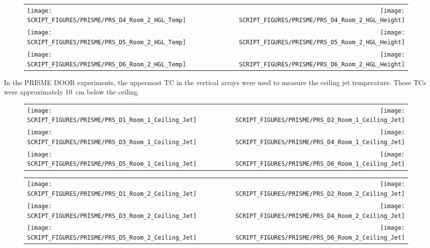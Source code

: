 \begin{figure}[p]
\begin{tabular*}{\textwidth}{l@{\extracolsep{\fill}}r}
\texttt{[image: SCRIPT\_FIGURES/PRISME/PRS\_D4\_Room\_2\_HGL\_Temp]} &
\texttt{[image: SCRIPT\_FIGURES/PRISME/PRS\_D4\_Room\_2\_HGL\_Height]} \\
\texttt{[image: SCRIPT\_FIGURES/PRISME/PRS\_D5\_Room\_2\_HGL\_Temp]} &
\texttt{[image: SCRIPT\_FIGURES/PRISME/PRS\_D5\_Room\_2\_HGL\_Height]} \\
\texttt{[image: SCRIPT\_FIGURES/PRISME/PRS\_D6\_Room\_2\_HGL\_Temp]} &
\texttt{[image: SCRIPT\_FIGURES/PRISME/PRS\_D6\_Room\_2\_HGL\_Height]}
\end{tabular*}
\label{PRISME_HGL_4}
\end{figure}

\clearpage

In the PRISME DOOR experiments, the uppermost TC in the vertical arrays were used to measure the ceiling jet temperature. These TCs were approximately 10~cm below the ceiling.

\begin{figure}[!ht]
\begin{tabular*}{\textwidth}{l@{\extracolsep{\fill}}r}
\texttt{[image: SCRIPT\_FIGURES/PRISME/PRS\_D1\_Room\_1\_Ceiling\_Jet]} &
\texttt{[image: SCRIPT\_FIGURES/PRISME/PRS\_D2\_Room\_1\_Ceiling\_Jet]} \\
\texttt{[image: SCRIPT\_FIGURES/PRISME/PRS\_D3\_Room\_1\_Ceiling\_Jet]} &
\texttt{[image: SCRIPT\_FIGURES/PRISME/PRS\_D4\_Room\_1\_Ceiling\_Jet]} \\
\texttt{[image: SCRIPT\_FIGURES/PRISME/PRS\_D5\_Room\_1\_Ceiling\_Jet]} &
\texttt{[image: SCRIPT\_FIGURES/PRISME/PRS\_D6\_Room\_1\_Ceiling\_Jet]}
\end{tabular*}
\label{PRISME_Ceiling_Jet_Room_1}
\end{figure}

\begin{figure}[p]
\begin{tabular*}{\textwidth}{l@{\extracolsep{\fill}}r}
\texttt{[image: SCRIPT\_FIGURES/PRISME/PRS\_D1\_Room\_2\_Ceiling\_Jet]} &
\texttt{[image: SCRIPT\_FIGURES/PRISME/PRS\_D2\_Room\_2\_Ceiling\_Jet]} \\
\texttt{[image: SCRIPT\_FIGURES/PRISME/PRS\_D3\_Room\_2\_Ceiling\_Jet]} &
\texttt{[image: SCRIPT\_FIGURES/PRISME/PRS\_D4\_Room\_2\_Ceiling\_Jet]} \\
\texttt{[image: SCRIPT\_FIGURES/PRISME/PRS\_D5\_Room\_2\_Ceiling\_Jet]} &
\texttt{[image: SCRIPT\_FIGURES/PRISME/PRS\_D6\_Room\_2\_Ceiling\_Jet]}
\end{tabular*}
\label{PRISME_Ceiling_Jet_Room_2}
\end{figure}

